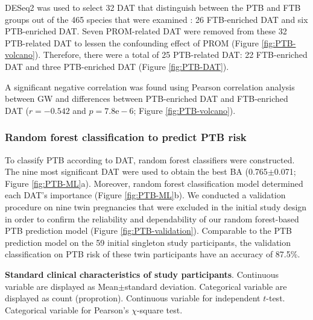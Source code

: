 \documentclass[11pt, a4paper, onecolumn, oneside]{report}
\begin{document}
                DESeq2 was used to select 32 DAT that distinguish between the PTB and FTB groups out of the 465 species that were examined \cite{DESeq2-1}: 26 FTB-enriched DAT and six PTB-enriched DAT. Seven PROM-related DAT were removed from these 32 PTB-related DAT to lessen the confounding effect of PROM (Figure \ref{fig:PTB-volcano}). Therefore, there were a total of 25 PTB-related DAT: 22 FTB-enriched DAT and three PTB-enriched DAT (Figure \ref{fig:PTB-DAT}).

                A significant negative correlation was found using Pearson correlation analysis between GW and differences between PTB-enriched DAT and FTB-enriched DAT ($r = -0.542$ and $p = 7.8\textrm{e}-6$; Figure \ref{fig:PTB-volcano}).

            \subsubsection{Random forest classification to predict PTB risk}
                To classify PTB according to DAT, random forest classifiers were constructed. The nine most significant DAT were used to obtain the best BA (0.765$\pm$0.071; Figure \ref{fig:PTB-ML}a). Moreover, random forest classification model determined each DAT's importance (Figure \ref{fig:PTB-ML}b). We conducted a validation procedure on nine twin pregnancies that were excluded in the initial study design in order to confirm the reliability and dependability of our random forest-based PTB prediction model (Figure \ref{fig:PTB-validation}). Comparable to the PTB prediction model on the 59 initial singleton study participants, the validation classification on PTB risk of these twin participants have an accuracy of 87.5\%.

            \begin{table}[p]
                \centering

                \caption[Standard clinical characteristics of study participants]{\textbf{Standard clinical characteristics of study participants}. Continuous variable are displayed as Mean$\pm$standard deviation. Categorical variable are displayed as count (proprotion). Continuous variable for independent $t$-test. Categorical variable for Pearson’s $\chi$-square test.}
                \label{tab:PTB-clinical}
            \end{table}
            \clearpage
\end{document}
